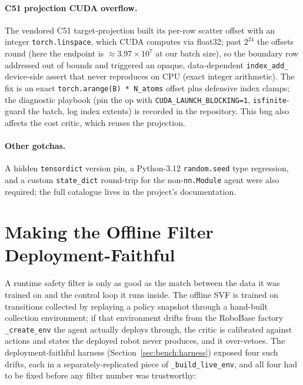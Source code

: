 \documentclass[11pt,a4paper]{report}
\begin{document}
\paragraph{C51 projection CUDA overflow.}
The vendored C51 target-projection built its per-row scatter offset
with an integer \texttt{torch.linspace}, which CUDA computes via
float32; past $2^{24}$ the offsets round (here the endpoint is
$\approx 3.97 \times 10^7$ at our batch size), so the boundary row
addressed out of bounds and triggered an opaque, data-dependent
\texttt{index\_add\_} device-side assert that never reproduces on
CPU (exact integer arithmetic). The fix is an exact
\texttt{torch.arange(B) * N\_atoms} offset plus defensive index
clamps; the diagnostic playbook (pin the op with
\texttt{CUDA\_LAUNCH\_BLOCKING=1}, \texttt{isfinite}-guard the
batch, log index extents) is recorded in the repository. This bug
also affects the cost critic, which reuses the projection.

\paragraph{Other gotchas.}
A hidden \texttt{tensordict} version pin, a Python-3.12
\texttt{random.seed} type regression, and a custom
\texttt{state\_dict} round-trip for the non-\texttt{nn.Module} agent
were also required; the full catalogue lives in the project's
documentation.

\section{Making the Offline Filter Deployment-Faithful}
\label{sec:impl:svf-faithful}

A runtime safety filter is only as good as the match between the data
it was trained on and the control loop it runs inside. The offline SVF
is trained on transitions collected by replaying a policy snapshot
through a hand-built collection environment; if that environment drifts
from the RoboBase factory \texttt{\_create\_env} the agent actually
deploys through, the critic is calibrated against actions and states
the deployed robot never produces, and it over-vetoes. The
deployment-faithful harness (Section~\ref{sec:bench:harness}) exposed
four such drifts, each in a separately-replicated piece of
\texttt{\_build\_live\_env}, and all four had to be fixed before any
filter number was trustworthy:
\end{document}
